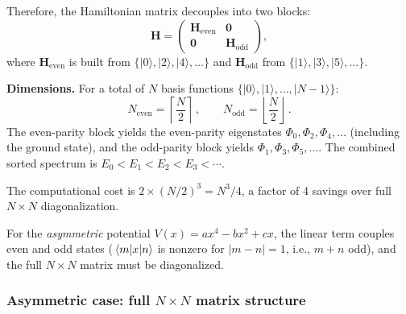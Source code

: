 Therefore, the Hamiltonian matrix decouples into two blocks:
\begin{equation}
  \mathbf{H} = \begin{pmatrix} \mathbf{H}_{\text{even}} & \mathbf{0} \\ \mathbf{0} & \mathbf{H}_{\text{odd}} \end{pmatrix},
\end{equation}
where $\mathbf{H}_{\text{even}}$ is built from $\{|0\rangle, |2\rangle, |4\rangle, \ldots\}$
and $\mathbf{H}_{\text{odd}}$ from $\{|1\rangle, |3\rangle, |5\rangle, \ldots\}$.

\textbf{Dimensions.} For a total of $N$ basis functions $\{|0\rangle, |1\rangle, \ldots, |N-1\rangle\}$:
\begin{equation}
  N_{\text{even}} = \left\lceil\frac{N}{2}\right\rceil\,,\qquad
  N_{\text{odd}} = \left\lfloor\frac{N}{2}\right\rfloor\,.
\end{equation}
The even-parity block yields the even-parity eigenstates $\Phi_0, \Phi_2, \Phi_4, \ldots$
(including the ground state), and the odd-parity block yields $\Phi_1, \Phi_3, \Phi_5, \ldots$.
The combined sorted spectrum is $E_0 < E_1 < E_2 < E_3 < \cdots$.

The computational cost is $2 \times (N/2)^3 = N^3/4$, a factor of 4 savings over full
$N\times N$ diagonalization.

For the \emph{asymmetric} potential $V(x) = ax^4 - bx^2 + cx$, the linear term couples
even and odd states ($\mel{m}{x}{n}$ is nonzero for $|m-n|=1$, i.e., $m+n$ odd), and the
full $N\times N$ matrix must be diagonalized.

\subsubsection*{Asymmetric case: full $N\times N$ matrix structure}

